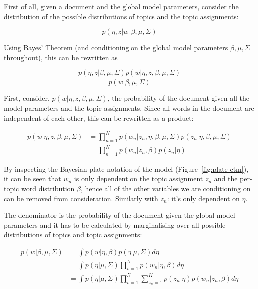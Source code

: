 \documentclass[12pt,a4paper,twoside,openright]{report}
\begin{document}
First of all, given a document and the global model parameters, consider the distribution of the possible distributions of topics and the topic assignments:

\begin{equation}
p(\eta, z | w, \beta, \mu, \Sigma)
\end{equation}

Using Bayes' Theorem (and conditioning on the global model parameters $\beta, \mu, \Sigma$ throughout), this can be rewritten as 

\begin{equation}
\frac{p(\eta, z | \beta, \mu, \Sigma) p(w | \eta, z, \beta, \mu, \Sigma)}{p(w | \beta, \mu, \Sigma)}
\end{equation}

First, consider, $p(w | \eta, z, \beta, \mu, \Sigma)$, the probability of the document given all the model parameters and the topic assignments. Since all words in the document are independent of each other, this can be rewritten as a product:

\begin{align}
p(w | \eta, z, \beta, \mu, \Sigma) &= \prod\limits_{n=1}^N p(w_n | z_n, \eta, \beta, \mu, \Sigma) p(z_n | \eta, \beta, \mu, \Sigma)\\
& = \prod\limits_{n=1}^N p(w_n | z_n, \beta) p(z_n | \eta)
\end{align}

By inspecting the Bayesian plate notation of the model (Figure~\ref{fig:plate-ctm}), it can be seen that $w_n$ is only dependent on the topic assignment $z_n$ and the per-topic word distribution $\beta$, hence all of the other variables we are conditioning on can be removed from consideration. Similarly with $z_n$: it's only dependent on $\eta$.

The denominator is the probability of the document given the global model parameters and it has to be calculated by marginalising over all possible distributions of topics and topic assignments:

\begin{align}
p(w | \beta, \mu, \Sigma) & = \int p(w | \eta, \beta) p(\eta | \mu, \Sigma) d\eta \\
& =\int p(\eta | \mu, \Sigma)  \prod\limits_{n=1}^N p(w_n | \eta, \beta) d\eta \\
& =\int p(\eta | \mu, \Sigma)  \prod\limits_{n=1}^N \sum\limits_{z_n=1}^K p(z_n | \eta) p(w_n | z_n, \beta) d\eta
\end{align}
\end{document}
